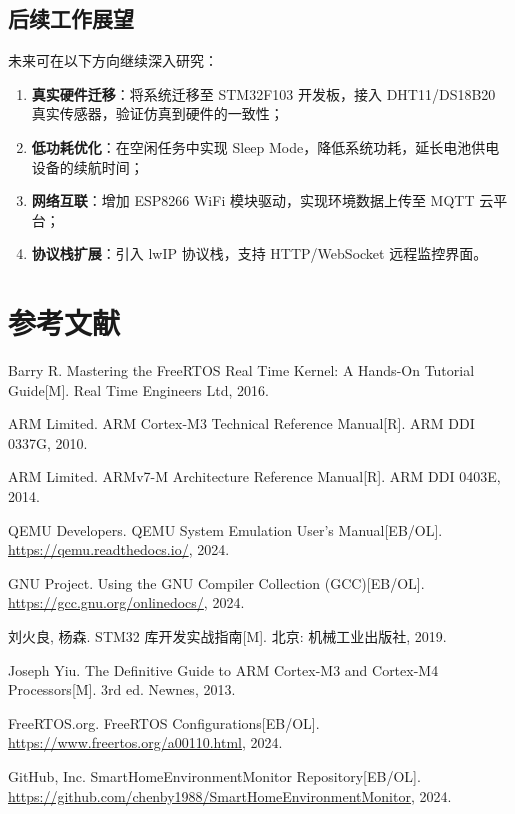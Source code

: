 \documentclass[12pt,a4paper]{ctexart}
\begin{document}
\subsection{后续工作展望}

未来可在以下方向继续深入研究：

\begin{enumerate}[leftmargin=2em]
    \item \textbf{真实硬件迁移}：将系统迁移至 STM32F103 开发板，接入 DHT11/DS18B20 真实传感器，验证仿真到硬件的一致性；
    \item \textbf{低功耗优化}：在空闲任务中实现 Sleep Mode，降低系统功耗，延长电池供电设备的续航时间；
    \item \textbf{网络互联}：增加 ESP8266 WiFi 模块驱动，实现环境数据上传至 MQTT 云平台；
    \item \textbf{协议栈扩展}：引入 lwIP 协议栈，支持 HTTP/WebSocket 远程监控界面。
\end{enumerate}

\newpage
\section*{参考文献}

\begin{enumerate}[label={[\arabic*]},leftmargin=2em,itemsep=2pt]
    \item Barry R. Mastering the FreeRTOS Real Time Kernel: A Hands-On Tutorial Guide[M]. Real Time Engineers Ltd, 2016.
    \item ARM Limited. ARM Cortex-M3 Technical Reference Manual[R]. ARM DDI 0337G, 2010.
    \item ARM Limited. ARMv7-M Architecture Reference Manual[R]. ARM DDI 0403E, 2014.
    \item QEMU Developers. QEMU System Emulation User's Manual[EB/OL]. \url{https://qemu.readthedocs.io/}, 2024.
    \item GNU Project. Using the GNU Compiler Collection (GCC)[EB/OL]. \url{https://gcc.gnu.org/onlinedocs/}, 2024.
    \item 刘火良, 杨森. STM32 库开发实战指南[M]. 北京: 机械工业出版社, 2019.
    \item Joseph Yiu. The Definitive Guide to ARM Cortex-M3 and Cortex-M4 Processors[M]. 3rd ed. Newnes, 2013.
    \item FreeRTOS.org. FreeRTOS Configurations[EB/OL]. \url{https://www.freertos.org/a00110.html}, 2024.
    \item GitHub, Inc. SmartHomeEnvironmentMonitor Repository[EB/OL]. \url{https://github.com/chenby1988/SmartHomeEnvironmentMonitor}, 2024.
\end{enumerate}
\end{document}
